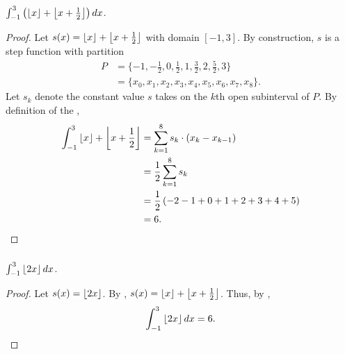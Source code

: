 \documentclass{report}
\begin{document}
\subsubsection{}%

  $\int_{-1}^3 \left(\left\lfloor x\right\rfloor + \left\lfloor x + \frac{1}{2}\right\rfloor\right) \mathop{dx}$.

  \begin{proof}
    Let $s(x) = \left\lfloor x\right\rfloor + \left\lfloor x + \frac{1}{2}\right\rfloor$ with domain $[-1, 3]$.
    By construction, $s$ is a step function with partition
      \begin{align*}
        P
          & = \{-1, -\frac{1}{2}, 0, \frac{1}{2}, 1, \frac{3}{2}, 2, \frac{5}{2},
                3\} \\
          & = \{x_0, x_1, x_2, x_3, x_4, x_5, x_6, x_7, x_8\}.
      \end{align*}
    Let $s_k$ denote the constant value $s$ takes on the $k$th open subinterval of
      $P$.
    By definition of the ,
      \begin{align*}
        \int_{-1}^3 \left\lfloor x\right\rfloor + \left\lfloor x + \frac{1}{2}\right\rfloor
          & = \sum_{k=1}^8 s_k \cdot (x_k - x_{k-1}) \\
          & = \frac{1}{2} \sum_{k=1}^8 s_k \\
          & = \frac{1}{2} \left( -2 - 1 + 0 + 1 + 2 + 3 + 4 + 5 \right) \\
          & = 6.
      \end{align*}
  \end{proof}

\subsubsection{}%

  $\int_{-1}^3 \left\lfloor2x\right\rfloor \mathop{dx}$.

  \begin{proof}
    Let $s(x) = \left\lfloor2x\right\rfloor$.
    By ,
      $s(x) = \left\lfloor x\right\rfloor + \left\lfloor x + \frac{1}{2}\right\rfloor$.
    Thus, by ,
      $$\int_{-1}^3 \left\lfloor2x\right\rfloor \mathop{dx} = 6.$$
  \end{proof}

\subsection{}%
\end{document}
